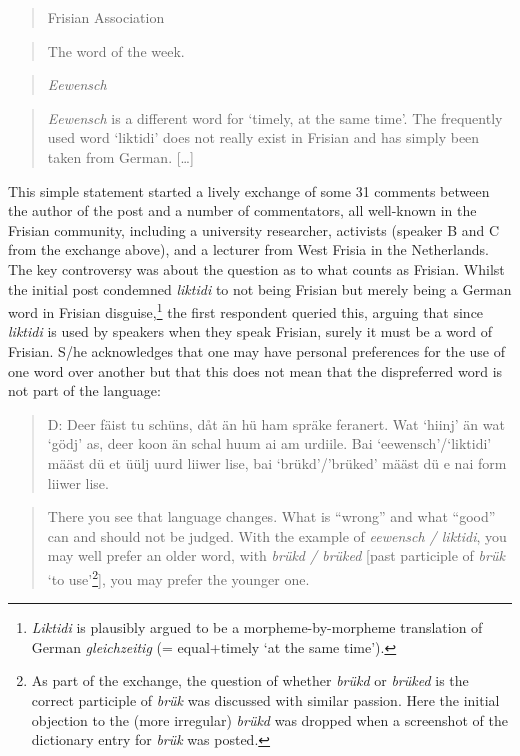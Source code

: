 \documentclass[output=paper]{langsci/langscibook}
\begin{document}
\begin{quote}
Frisian Association
\end{quote}

\begin{quote}
The word of the week.
\end{quote}

\begin{quote}
\textit{Eewensch}
\end{quote}

\begin{quote}
\textit{Eewensch} is a different word for ‘timely, at the same time’. The frequently used word ‘liktidi’ does not really exist in Frisian and has simply been taken from German. […]
\end{quote}

This simple statement started a lively exchange of some 31 comments between the author of the post and a number of commentators, all well-known in the Frisian community, including a university researcher, activists (speaker B and C from the exchange above), and a lecturer from West Frisia in the Netherlands. The key controversy was about the question as to what counts as Frisian. Whilst the initial post condemned \textit{liktidi} to not being Frisian but merely being a German word in Frisian disguise,\footnote{\textit{Liktidi} is plausibly argued to be a morpheme-by-morpheme translation of German \textit{gleichzeitig} (= equal+timely ‘at the same time’).} the first respondent queried this, arguing that since \textit{liktidi} is used by speakers when they speak Frisian, surely it must be a word of Frisian. S/he acknowledges that one may have personal preferences for the use of one word over another but that this does not mean that the dispreferred word is not part of the language:

\begin{quote}
D: Deer fäist tu schüns, dåt än hü ham spräke feranert. Wat ‘hiinj’ än wat ‘gödj’ as, deer koon än schal huum ai am urdiile. Bai ‘eewensch’/‘liktidi’ määst dü et üülj uurd liiwer lise, bai ‘brükd’/’brüked’ määst dü e nai form liiwer lise. 
\end{quote}

\begin{quote}
There you see that language changes. What is “wrong” and what “good” can and should not be judged. With the example of \textit{eewensch / liktidi}, you may well prefer an older word, with \textit{brükd / brüked} [past participle of \textit{brük} ‘to use’\footnote{As part of the exchange, the question of whether \textit{brükd} or \textit{brüked} is the correct participle of \textit{brük} was discussed with similar passion. Here the initial objection to the (more irregular) \textit{brükd} was dropped when a screenshot of the dictionary entry for \textit{brük} was posted.}], you may prefer the younger one. 
\end{quote}
\end{document}
